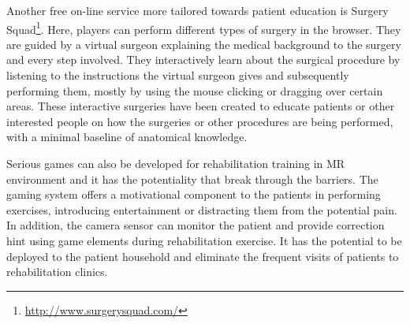 Another free on-line service more tailored towards patient education is Surgery Squad\footnote{\url{http://www.surgerysquad.com/}}. Here, players can perform different types of surgery in the browser. They are guided by a virtual surgeon explaining the medical background to the surgery and every step involved. They interactively learn about the surgical procedure by listening to the instructions the virtual surgeon gives and subsequently performing them, mostly by using the mouse clicking or dragging over certain areas. These interactive surgeries have been created to educate patients or other interested people on how the surgeries or other procedures are being performed, with a minimal baseline of anatomical knowledge.

Serious games can also be developed for rehabilitation training in MR environment and it has the potentiality that break through the barriers. The gaming system offers a motivational component to the patients in performing exercises, introducing entertainment or distracting them from the potential pain. 
In addition, the camera sensor can monitor the patient and provide correction hint using game elements during rehabilitation exercise. It has the potential to be deployed to the patient household and eliminate the frequent visits of patients to rehabilitation clinics.

